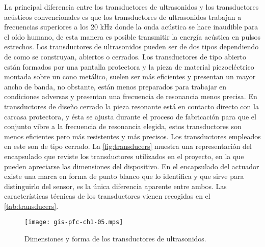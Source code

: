 La principal diferencia entre los transductores de ultrasonidos y los
transductores acústicos convencionales es que los transductores de
ultrasonidos trabajan a frecuencias superiores a los 20 kHz donde la onda
acústica se hace inaudible para el oído humano, de esta manera es posible
transmitir la energía acústica en pulsos estrechos. Los transductores de
ultrasonidos pueden ser de dos tipos dependiendo de como se construyan,
abiertos o cerrados. Los transductores de tipo abierto están formados por
una pantalla protectora y la pieza de material piezoeléctrico montada sobre
un cono metálico, suelen ser más eficientes y presentan un mayor ancho de
banda, no obstante, están menos preparados para trabajar en condiciones
adversas y presentan una frecuencia de resonancia menos precisa. En
transductores de diseño cerrado la pieza resonante está en contacto directo
con la carcasa protectora, y ésta se ajusta durante el proceso de
fabricación para que el conjunto vibre a la frecuencia de resonancia
elegida, estos transductores son menos eficientes pero más resistentes y
más precisos. Los transductores empleados en este  son de tipo
cerrado. La \vref{fig:transducers} muestra una representación del
encapsulado que reviste los transductores utilizados en el proyecto, en la
que pueden apreciarse las dimensiones del dispositivo. En el encapsulado
del actuador existe una marca en forma de punto blanco que lo identifica y
que sirve para distinguirlo del sensor, es la única diferencia aparente
entre ambos. Las características técnicas de los transductores vienen
recogidas en el \cref{tab:transducers}.

\begin{figure}
	\begin{center}
		\texttt{[image: gis-pfc-ch1-05.mps]}
	\end{center}
	\caption[Dimensiones de los transductores de
	ultrasonidos]{Dimensiones y forma de los transductores de
	ultrasonidos.}
	\label{fig:transducers}
\end{figure}

